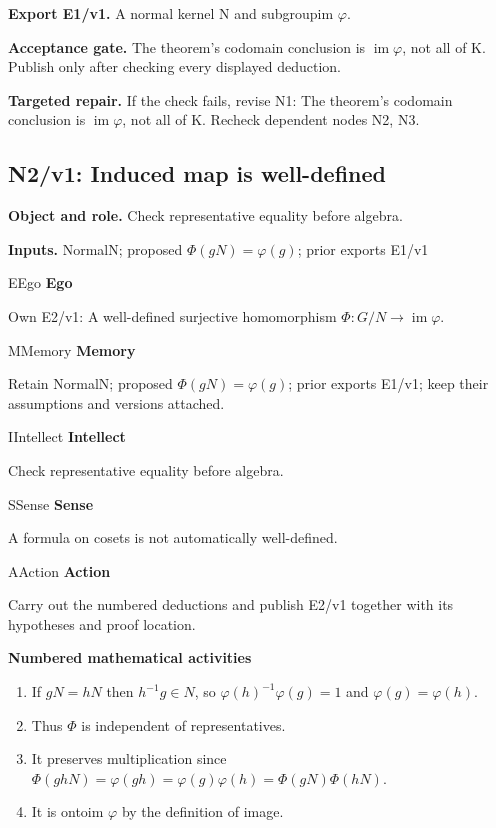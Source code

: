 \documentclass[preprint,12pt,aps,pra,showkeys,amsmath,amssymb,superscriptaddress,floatfix]{revtex4-2}
\theoremstyle{definition}
\theoremstyle{remark}
\newcommand{\mmfaculty}[3]{%
 \begin{mmfacultybox}{#1}{#2}
 {\sffamily\bfseries\color{MMBlue}#2}\par\smallskip #3
 \end{mmfacultybox}}
\newcommand{\field}[2]{\par\smallskip\noindent\textbf{#1.} #2\par}
\begin{document}
\field{Export E1/v1}{A normal kernel N and subgroupim \(\varphi\).}

\field{Acceptance gate}{The theorem's codomain conclusion is \(\operatorname{im} \varphi\), not
all of K. Publish only after checking every displayed deduction.}

\field{Targeted repair}{If the check fails, revise N1: The theorem's codomain conclusion is
\(\operatorname{im} \varphi\), not all of K. Recheck dependent nodes N2,
N3.}

\clearpage

\subsection{N2/v1: Induced map is well-defined}

\field{Object and role}{Check representative equality before algebra.}

\field{Inputs}{NormalN; proposed \(\Phi (gN)=\varphi (g)\); prior exports E1/v1}

\mmfaculty{E}{Ego}{Own E2/v1: A well-defined surjective homomorphism
\(\Phi :G/N\to \operatorname{im} \varphi\).}

\mmfaculty{M}{Memory}{Retain NormalN; proposed \(\Phi (gN)=\varphi (g)\); prior exports E1/v1;
keep their assumptions and versions attached.}

\mmfaculty{I}{Intellect}{Check representative equality before algebra.}

\mmfaculty{S}{Sense}{A formula on cosets is not automatically well-defined.}

\mmfaculty{A}{Action}{Carry out the numbered deductions and publish E2/v1 together with its
hypotheses and proof location.}

\smallskip\noindent\textbf{Numbered mathematical activities}

\begin{enumerate}[label=N2.\arabic*,leftmargin=3.4em]

\item If \(gN=hN\) then \(h^{-1}g\in N\), so \(\varphi (h)^{-1}\varphi (g)=1\)
and \(\varphi (g)=\varphi (h)\).

\item Thus \(\Phi\) is independent of representatives.

\item It preserves multiplication since
\(\Phi (ghN)=\varphi (gh)=\varphi (g)\varphi (h)=\Phi (gN)\Phi (hN)\).

\item It is ontoim \(\varphi\) by the definition of image.

\end{enumerate}
\end{document}
